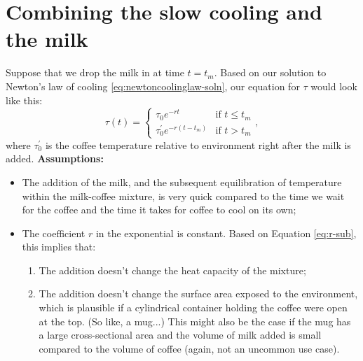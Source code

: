 \documentclass[11pt]{article}
\begin{document}
\section{Combining the slow cooling and the milk}

Suppose that we drop the milk in at time $t = t_{m}$. Based on our solution to Newton's law of cooling \eqref{eq:newtoncoolinglaw-soln}, our equation for $\tau$ would look like this:
\begin{equation}
\tau(t) = 
\begin{cases}
\tau_{0} e^{-rt} & \text{if } t \leq t_{m}\\
\tau_{0}^{'} e^{-r(t-t_{m})}  & \text{if } t > t_{m}
\end{cases},
\end{equation}
where $\tau_{0}^{'}$ is the coffee temperature relative to environment right after the milk is added. \textbf{Assumptions: }
\begin{itemize}
	\item The addition of the milk, and the subsequent equilibration of temperature within the milk-coffee mixture, is very quick compared to the time we wait for the coffee and the time it takes for coffee to cool on its own;
	\item The coefficient $r$ in the exponential is constant. Based on Equation \eqref{eq:r-sub}, this implies that:
		\begin{enumerate}
			\item The addition doesn't change the heat capacity of the mixture;  
			\item The addition doesn't change the surface area exposed to the environment, which is plausible if a cylindrical container holding the coffee were open at the top. (So like, a mug...) This might also be the case if the mug has a large cross-sectional area and the volume of milk added is small compared to the volume of coffee (again, not an uncommon use case).
		\end{enumerate}
\end{itemize}
\end{document}
